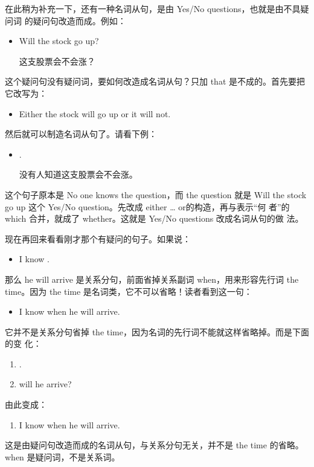 在此稍为补充一下，还有一种名词从句，是由 Yes/No questions，也就是由不具疑问词
的疑问句改造而成。例如：
\begin{itemize}
\item Will the stock go up?

  这支股票会不会涨？
\end{itemize}
这个疑问句没有疑问词，要如何改造成名词从句？只加 that
是不成的。首先要把它改写为：
\begin{itemize}
\item Either the stock will go up or it will not.
\end{itemize}
然后就可以制造名词从句了。请看下例：
\begin{itemize}
\item {}  .

  没有人知道这支股票会不会涨。
\end{itemize}
这个句子原本是 No one knows the question，而 the question 就是 Will the
stock go up 这个 Yes/No question。先改成 either \ldots{} or的构造，再与表示“何
者”的 which 合并，就成了 whether。这就是 Yes/No questions 改成名词从句的做
法。

现在再回来看看刚才那个有疑问的句子。如果说：
\begin{itemize}
\item I know  .
\end{itemize}
那么 he will arrive 是关系分句，前面省掉关系副词 when，用来形容先行词
the time。因为 the time 是名词类，它不可以省略！读者看到这一句：
\begin{itemize}
\item   I know when he will arrive.
\end{itemize}
它并不是关系分句省掉 the time，因为名词的先行词不能就这样省略掉。而是下面的变
化：
\begin{enumerate}
\item {}  .
\item {} will he arrive?
\end{enumerate}

由此变成：
\begin{enumerate}[resume]
\item I know when he will arrive.
\end{enumerate}
这是由疑问句改造而成的名词从句，与关系分句无关，并不是 the time
的省略。when 是疑问词，不是关系词。

